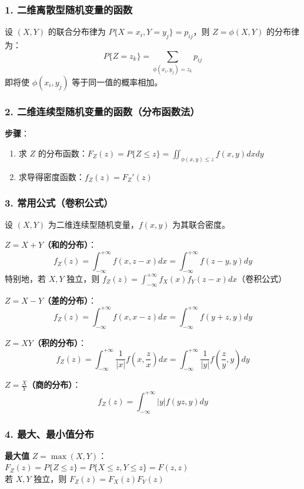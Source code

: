 \documentclass[12pt,a4paper]{ctexart}
\begin{document}
\subsubsection{1. 二维离散型随机变量的函数}
设 $(X, Y)$ 的联合分布律为 $P\{X = x_i, Y = y_j\} = p_{ij}$，则 $Z = \phi(X, Y)$ 的分布律为：
\[ P\{Z = z_k\} = \sum_{\phi(x_i, y_j) = z_k} p_{ij} \]
即将使 $\phi(x_i, y_j)$ 等于同一值的概率相加。

\subsubsection{2. 二维连续型随机变量的函数（分布函数法）}
\textbf{步骤}：
\begin{enumerate}[noitemsep]
    \item 求 $Z$ 的分布函数：$F_Z(z) = P\{Z \le z\} = \iint_{\phi(x, y) \le z} f(x, y) dx dy$
    \item 求导得密度函数：$f_Z(z) = F_Z'(z)$
\end{enumerate}

\subsubsection{3. 常用公式（卷积公式）}
设 $(X, Y)$ 为二维连续型随机变量，$f(x, y)$ 为其联合密度。

\textbf{$Z = X + Y$（和的分布）}：
\[ f_Z(z) = \int_{-\infty}^{+\infty} f(x, z-x) dx = \int_{-\infty}^{+\infty} f(z-y, y) dy \]
特别地，若 $X, Y$ 独立，则 $f_Z(z) = \int_{-\infty}^{+\infty} f_X(x) f_Y(z-x) dx$（卷积公式）

\textbf{$Z = X - Y$（差的分布）}：
\[ f_Z(z) = \int_{-\infty}^{+\infty} f(x, x-z) dx = \int_{-\infty}^{+\infty} f(y+z, y) dy \]

\textbf{$Z = XY$（积的分布）}：
\[ f_Z(z) = \int_{-\infty}^{+\infty} \frac{1}{|x|} f\left(x, \frac{z}{x}\right) dx = \int_{-\infty}^{+\infty} \frac{1}{|y|} f\left(\frac{z}{y}, y\right) dy \]

\textbf{$Z = \frac{X}{Y}$（商的分布）}：
\[ f_Z(z) = \int_{-\infty}^{+\infty} |y| f(yz, y) dy \]

\subsubsection{4. 最大、最小值分布}
\textbf{最大值} $Z = \max(X, Y)$：\\
$F_Z(z) = P\{Z \le z\} = P\{X \le z, Y \le z\} = F(z, z)$\\
若 $X, Y$ 独立，则 $F_Z(z) = F_X(z) F_Y(z)$
\end{document}
